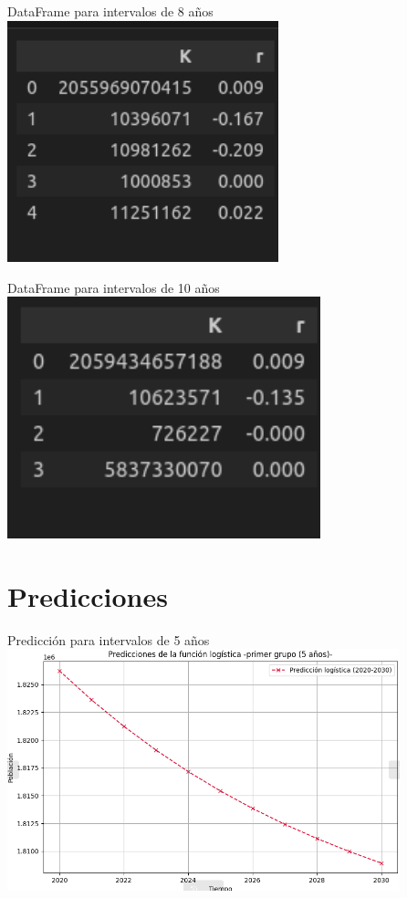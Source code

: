 \documentclass{beamer}
\begin{document}
\begin{frame}{DataFrame para intervalos de 8 años}
    \includegraphics[height = 7cm]{img/graph_img/df8.png}
\end{frame} 

\begin{frame}{DataFrame para intervalos de 10 años}
    \includegraphics[height = 7cm]{img/graph_img/df10.png}
\end{frame} 

\section{Predicciones}
\begin{frame}{Predicción para intervalos de 5 años}
    \includegraphics[height = 7cm]{img/graph_img/pred5.png}
\end{frame}
\end{document}
